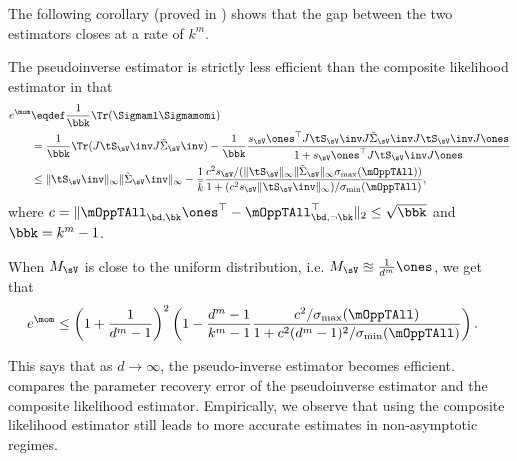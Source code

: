 The following corollary (proved in ) shows that
the gap between the two estimators closes at a rate of $k^m$.
\begin{corollary}
  \label{cor:efficiency}
The pseudoinverse estimator is strictly less efficient
than the composite likelihood estimator in that 
\begin{align*}
e^\mom &\eqdef 
    \frac{1}{\bbk} \Tr(\Sigmaml\Sigmamomi ) \\
        &= \frac{1}{\bbk} \Tr( J \tS_\sV\inv J \tilde\Sigma_\sV\inv ) - \frac{1}{\bbk} \frac{s_\sV \ones^\top J \tS_\sV\inv J \tilde\Sigma_\sV\inv J \tS_\sV\inv J \ones }
      {1 + s_\sV \ones^\top J \tS_\sV\inv J \ones} \\
    &\le \|\tS_\sV\inv\|_\infty  \|\tilde\Sigma_\sV\inv\|_\infty 
    - 
        \frac{1}{\bar k} 
    \frac{
        c^2 s_\sV/(\|\tS_\sV\|_{\infty} \|\tilde\Sigma_\sV\|_{\infty}
            \sigma_{\max}(\mOppTAll))
    }
    {1 + (c^2 s_\sV \|\tS_\sV\inv\|_{\infty})/
          \sigma_{\min}(\mOppTAll)
    },
\end{align*}
where $c = \|\mOppTAll_{\bd,\bk} \ones^\top - \mOppTAll_{\bd,\neg \bk}^\top\|_2 \le \sqrt{\bbk}$ and $\bbk = k^m - 1$.

When $M_\sV$ is close to the uniform distribution, i.e. $M_\sV \approxeq \frac{1}{d^m} \ones$, we get that 
\begin{align*}
e^\mom 
    &\le
    \left(1 + \frac{1}{d^m - 1}\right)^2 
    \left(1 - \frac{d^m - 1}{k^m - 1} \frac{c^2/\sigma_{\max}(\mOppTAll)}{1 + c^2 (d^m - 1)^2 / \sigma_{\min}(\mOppTAll)}\right).
\end{align*}
\end{corollary}

This says that as $d \to \infty$, the pseudo-inverse estimator becomes
efficient. 
 compares the parameter recovery error of the
  pseudoinverse estimator and the composite likelihood estimator.
Empirically, we observe that using the composite likelihood estimator
still leads to more accurate estimates in non-asymptotic regimes.



